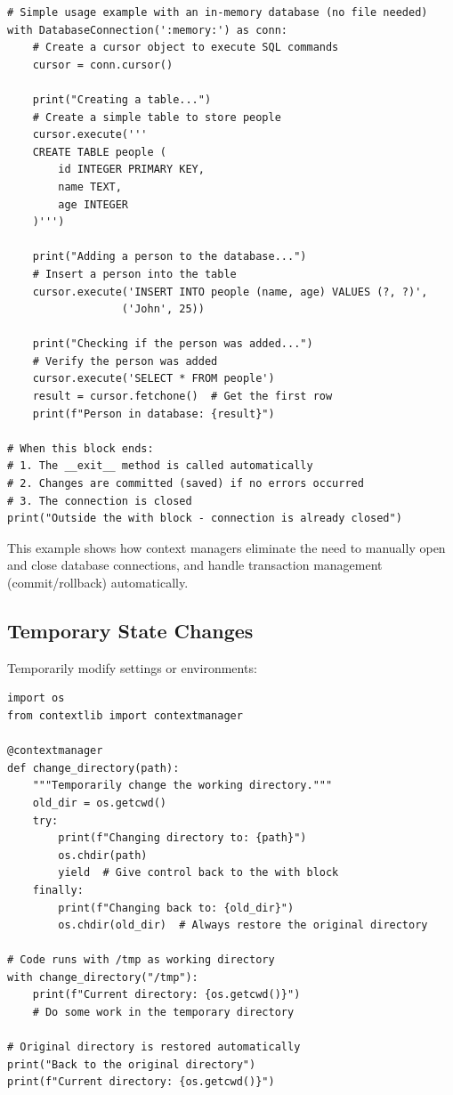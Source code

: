 \documentclass[12pt,letterpaper]{article}
\newenvironment{macterminal}{%
    \begin{mdframed}[
        linecolor=terminalFrame,
        backgroundcolor=terminalBg,
        roundcorner=5pt,
        skipabove=10pt,
        skipbelow=10pt,
        linewidth=1pt,
        innertopmargin=10pt, %
        frametitle={%
            \tikz[baseline=(current bounding box.east), outer sep=0pt]{
                \fill[red!80!black] (0,0) circle (5pt);
                \fill[yellow!80!black] (0.7,0) circle (5pt);
                \fill[green!70!black] (1.4,0) circle (5pt);
            }
        },
        frametitlealignment=\raggedright, %
        frametitleaboveskip=8pt, %
        frametitlebelowskip=0pt, %
    ]
}{%
    \end{mdframed}%
}
\begin{document}
\begin{macterminal}
\begin{lstlisting}
# Simple usage example with an in-memory database (no file needed)
with DatabaseConnection(':memory:') as conn:
    # Create a cursor object to execute SQL commands
    cursor = conn.cursor()
    
    print("Creating a table...")
    # Create a simple table to store people
    cursor.execute('''
    CREATE TABLE people (
        id INTEGER PRIMARY KEY,
        name TEXT,
        age INTEGER
    )''')
    
    print("Adding a person to the database...")
    # Insert a person into the table
    cursor.execute('INSERT INTO people (name, age) VALUES (?, ?)', 
                  ('John', 25))
    
    print("Checking if the person was added...")
    # Verify the person was added
    cursor.execute('SELECT * FROM people')
    result = cursor.fetchone()  # Get the first row
    print(f"Person in database: {result}")
    
# When this block ends:
# 1. The __exit__ method is called automatically
# 2. Changes are committed (saved) if no errors occurred
# 3. The connection is closed
print("Outside the with block - connection is already closed")
\end{lstlisting}
\end{macterminal}

This example shows how context managers eliminate the need to manually open and close database connections, and handle transaction management (commit/rollback) automatically.

\subsection{Temporary State Changes}

Temporarily modify settings or environments:

\begin{macterminal}
\begin{lstlisting}
import os
from contextlib import contextmanager

@contextmanager
def change_directory(path):
    """Temporarily change the working directory."""
    old_dir = os.getcwd()
    try:
        print(f"Changing directory to: {path}")
        os.chdir(path)
        yield  # Give control back to the with block
    finally:
        print(f"Changing back to: {old_dir}")
        os.chdir(old_dir)  # Always restore the original directory

# Code runs with /tmp as working directory
with change_directory("/tmp"):
    print(f"Current directory: {os.getcwd()}")
    # Do some work in the temporary directory
    
# Original directory is restored automatically
print("Back to the original directory")
print(f"Current directory: {os.getcwd()}")
\end{lstlisting}
\end{macterminal}
\end{document}
